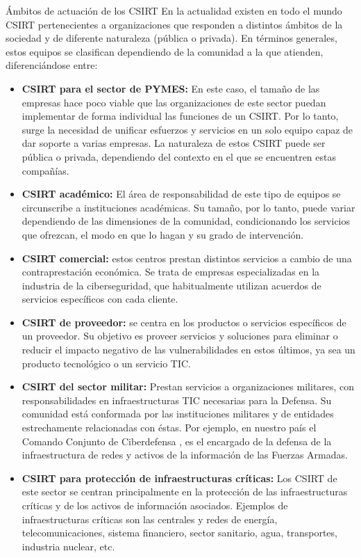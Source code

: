    \begin{section}{Ámbitos de actuación de los CSIRT}
        En la actualidad existen en todo el mundo CSIRT pertenecientes a organizaciones que responden a distintos ámbitos de la sociedad y de diferente naturaleza (pública o privada). En términos generales, estos equipos se clasifican dependiendo de la comunidad a la que atienden, diferenciándose entre:
        \begin{itemize}
            \item \textbf{CSIRT para el sector de PYMES:} En este caso, el tamaño de las empresas hace poco viable que las organizaciones de este sector puedan implementar de forma individual las funciones de un CSIRT. Por lo tanto, surge la necesidad de unificar esfuerzos y servicios en un solo equipo capaz de dar soporte a varias empresas. La naturaleza de estos CSIRT puede ser pública o privada, dependiendo del contexto en el que se encuentren estas compañías.
            \item \textbf{CSIRT académico:} El área de responsabilidad de este tipo de equipos se circunscribe a instituciones académicas. Su tamaño, por lo tanto, puede variar dependiendo de las dimensiones de la comunidad, condicionando los servicios que ofrezcan, el modo en que lo hagan y su grado de intervención.
            \item \textbf{CSIRT comercial:} estos centros prestan distintos servicios a cambio de una contraprestación económica. Se trata de empresas especializadas en la industria de la ciberseguridad, que habitualmente utilizan acuerdos de servicios específicos con cada cliente.
            \item \textbf{CSIRT de proveedor:} se centra en los productos o servicios específicos de un proveedor. Su objetivo es proveer servicios y soluciones para eliminar o reducir el impacto negativo de las vulnerabilidades en estos últimos, ya sea un producto tecnológico o un servicio TIC.
            \item \textbf{CSIRT del sector militar:} Prestan servicios a organizaciones militares, con responsabilidades en infraestructuras TIC necesarias para la Defensa. Su comunidad está conformada por las instituciones militares y de entidades estrechamente relacionadas con éstas. Por ejemplo, en nuestro país el Comando Conjunto de Ciberdefensa \cite{fa_comando}, es el encargado de la defensa de la infraestructura de redes y activos de la información de las Fuerzas Armadas.
            \item \textbf{CSIRT para protección de infraestructuras críticas:}  Los CSIRT de este sector se centran principalmente en la protección de las infraestructuras críticas  y de los activos de información asociados. Ejemplos de infraestructuras críticas son las centrales y redes de energía, telecomunicaciones, sistema financiero, sector sanitario, agua, transportes, industria nuclear, etc.

\end{itemize}
\end{section}
